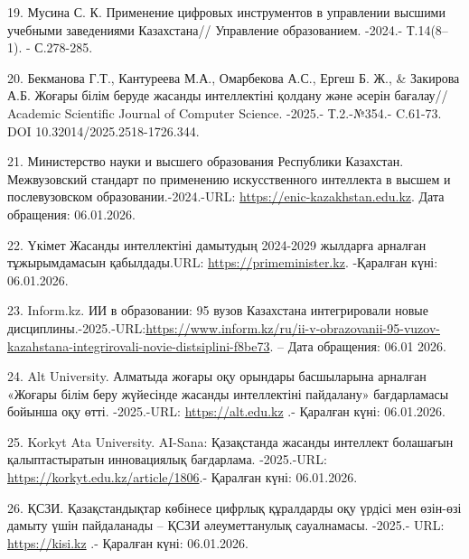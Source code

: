 \begin{refs}
19. Мусина С. К. Применение цифровых инструментов в управлении высшими
учебными заведениями Казахстана// Управление образованием. -2024.-
Т.14(8--1). - С.278-285.

20. Бекманова Г.Т., Кантуреева М.А., Омарбекова А.С., Ергеш Б. Ж., \&
Закирова А.Б. Жоғары білім беруде жасанды интеллектіні қолдану және
әсерін бағалау// Academic Scientific Journal of Computer Science.
-2025.- Т.2.-№354.- C.61-73. DOI 10.32014/2025.2518-1726.344.

21. Министерство науки и высшего образования Республики Казахстан.
Межвузовский стандарт по применению искусственного интеллекта в высшем и
послевузовском образовании.-2024.-URL:
\href{https://enic-kazakhstan.edu.kz/files/1703569802/o-proekte-mezhvuzovskogo-standarta-po-primeneniyu-iskusstvennogo-intellekta.pdf}{https://enic-kazakhstan.edu.kz}. Дата обращения: 06.01.2026.

22. Үкімет Жасанды интеллектіні дамытудың 2024-2029 жылдарға арналған
тұжырымдамасын қабылдады.URL:
\href{https://primeminister.kz/news/ukimet-zhasandy-intellektini-damytudyn-2024-2029-zhyldarga-arnalgan-tuzhyrymdamasyn-kabyldady-28786}{https://primeminister.kz}. -Қаралған күні: 06.01.2026.

23. Inform.kz. ИИ в образовании: 95 вузов Казахстана интегрировали новые
дисциплины.-2025.-URL:\url{https://www.inform.kz/ru/ii-v-obrazovanii-95-vuzov-kazahstana-integrirovali-novie-distsiplini-f8be73}.
-- Дата обращения: 06.01 2026.

24. Alt University. Алматыда жоғары оқу орындары басшыларына арналған
«Жоғары білім беру жүйесінде жасанды интеллектіні пайдалану»
бағдарламасы бойынша оқу өтті. -2025.-URL:
\href{https://alt.edu.kz/zhanalyqtar/almatyda-zhoghary-oqu-oryndary-basshylaryna-arnalghan-zhoghary-bilim-beru-zhuejesinde-zhasandy-intellektini-pajdalanu-baghdarlamasy-bojynsha-oqu-oetti/}{https://alt.edu.kz} .-
Қаралған күні: 06.01.2026.

25. Korkyt Ata University. AI-Sana: Қазақстанда жасанды интеллект
болашағын қалыптастыратын инновациялық бағдарлама. -2025.-URL:
\url{https://korkyt.edu.kz/article/1806}.- Қаралған күні: 06.01.2026.

26. ҚСЗИ. Қазақстандықтар көбінесе цифрлық құралдарды оқу үрдісі мен
өзін-өзі дамыту үшін пайдаланады -- ҚСЗИ әлеуметтанулық сауалнамасы.
-2025.- URL:
\href{https://kisi.kz/kazakstandyktar-kobinese-chifrlyk-kuraldardy-oku-urdisi-men-ozin-ozi-damytu-ushin-pajdalanady-kszi-aleumettik-saualnamasy/}{https://kisi.kz} .-
Қаралған күні: 06.01.2026.


\end{refs}
